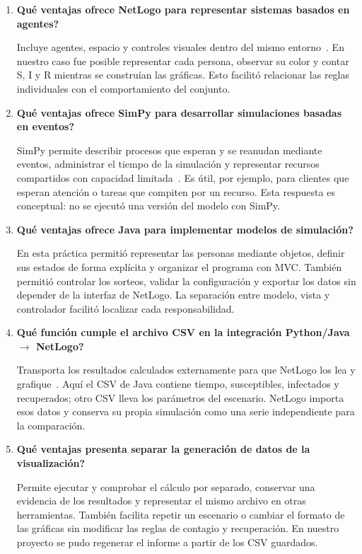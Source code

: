 \documentclass[11pt,a4paper]{article}
\begin{document}
\begin{enumerate}
\item \textbf{\textquestiondown{}Qué ventajas ofrece NetLogo para representar sistemas basados en agentes?}
\par Incluye agentes, espacio y controles visuales dentro del mismo entorno~\cite{netlogo}. En nuestro caso fue posible representar cada persona, observar su color y contar S, I y R mientras se construían las gráficas. Esto facilitó relacionar las reglas individuales con el comportamiento del conjunto.

\item \textbf{\textquestiondown{}Qué ventajas ofrece SimPy para desarrollar simulaciones basadas en eventos?}
\par SimPy permite describir procesos que esperan y se reanudan mediante eventos, administrar el tiempo de la simulación y representar recursos compartidos con capacidad limitada~\cite{simpy}. Es útil, por ejemplo, para clientes que esperan atención o tareas que compiten por un recurso. Esta respuesta es conceptual: no se ejecutó una versión del modelo con SimPy.

\item \textbf{\textquestiondown{}Qué ventajas ofrece Java para implementar modelos de simulación?}
\par En esta práctica permitió representar las personas mediante objetos, definir sus estados de forma explícita y organizar el programa con MVC. También permitió controlar los sorteos, validar la configuración y exportar los datos sin depender de la interfaz de NetLogo. La separación entre modelo, vista y controlador facilitó localizar cada responsabilidad.

\item \textbf{\textquestiondown{}Qué función cumple el archivo CSV en la integración Python/Java $\rightarrow$ NetLogo?}
\par Transporta los resultados calculados externamente para que NetLogo los lea y grafique~\cite{csv}. Aquí el CSV de Java contiene tiempo, susceptibles, infectados y recuperados; otro CSV lleva los parámetros del escenario. NetLogo importa esos datos y conserva su propia simulación como una serie independiente para la comparación.

\item \textbf{\textquestiondown{}Qué ventajas presenta separar la generación de datos de la visualización?}
\par Permite ejecutar y comprobar el cálculo por separado, conservar una evidencia de los resultados y representar el mismo archivo en otras herramientas. También facilita repetir un escenario o cambiar el formato de las gráficas sin modificar las reglas de contagio y recuperación. En nuestro proyecto se pudo regenerar el informe a partir de los CSV guardados.
\end{enumerate}
\FloatBarrier
\end{document}
